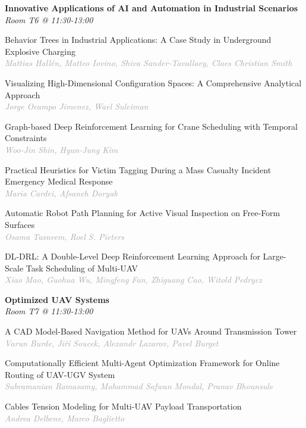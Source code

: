 \begin{multicols*}{2}
\normalsize \textbf{Innovative Applications of AI and Automation in Industrial Scenarios}\\
\small \textit{Room T6 @ 11:30-13:00}

\small Behavior Trees in Industrial Applications: A Case Study in Underground Explosive Charging\\ 
\footnotesize \textcolor{darkgray}{\textit{Mattias Hallén, Matteo  Iovino, Shiva  Sander-Tavallaey, Claes Christian  Smith}}

\small Visualizing High-Dimensional Configuration Spaces: A Comprehensive Analytical Approach\\ 
\footnotesize \textcolor{darkgray}{\textit{Jorge Ocampo Jimenez, Wael  Suleiman}}

\small Graph-based Deep Reinforcement Learning for Crane Scheduling with Temporal Constraints\\ 
\footnotesize \textcolor{darkgray}{\textit{Woo-Jin Shin, Hyun-Jung  Kim}}

\small Practical Heuristics for Victim Tagging During a Mass Casualty Incident Emergency Medical Response\\ 
\footnotesize \textcolor{darkgray}{\textit{Maria Cardei, Afsaneh  Doryab}}

\small Automatic Robot Path Planning for Active Visual Inspection on Free-Form Surfaces\\ 
\footnotesize \textcolor{darkgray}{\textit{Osama Tasneem, Roel S.  Pieters}}

\small DL-DRL: A Double-Level Deep Reinforcement Learning Approach for Large-Scale Task Scheduling of Multi-UAV\\ 
\footnotesize \textcolor{darkgray}{\textit{Xiao Mao, Guohua  Wu, Mingfeng  Fan, Zhiguang  Cao, Witold  Pedrycz}}

\normalsize \textbf{Optimized UAV Systems}\\
\small \textit{Room T7 @ 11:30-13:00}

\small A CAD Model-Based Navigation Method for UAVs Around Transmission Tower\\ 
\footnotesize \textcolor{darkgray}{\textit{Varun Burde, Jiří Soucek, Alexandr Lazarov, Pavel  Burget}}

\small Computationally Efficient Multi-Agent Optimization Framework for Online Routing of UAV-UGV System\\ 
\footnotesize \textcolor{darkgray}{\textit{Subramanian Ramasamy, Mohammad Safwan  Mondal, Pranav  Bhounsule}}

\small Cables Tension Modeling for Multi-UAV Payload Transportation\\ 
\footnotesize \textcolor{darkgray}{\textit{Andrea Delbene, Marco  Baglietto}}


\end{multicols*}
